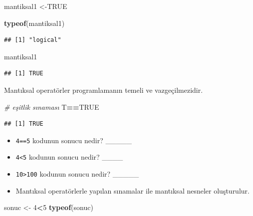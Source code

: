 \documentclass[
  oneside]{book}
\newenvironment{Shaded}{\begin{snugshade}}{\end{snugshade}}
\newcommand{\CommentTok}[1]{\textcolor[rgb]{0.56,0.35,0.01}{\textit{#1}}}
\newcommand{\ConstantTok}[1]{\textcolor[rgb]{0.56,0.35,0.01}{#1}}
\newcommand{\DecValTok}[1]{\textcolor[rgb]{0.00,0.00,0.81}{#1}}
\newcommand{\FunctionTok}[1]{\textcolor[rgb]{0.13,0.29,0.53}{\textbf{#1}}}
\newcommand{\NormalTok}[1]{#1}
\newcommand{\OtherTok}[1]{\textcolor[rgb]{0.56,0.35,0.01}{#1}}
\newcommand{\SpecialCharTok}[1]{\textcolor[rgb]{0.81,0.36,0.00}{\textbf{#1}}}
\begin{document}
\begin{Shaded}
\begin{Highlighting}[]
\NormalTok{mantiksal1 }\OtherTok{\textless{}{-}}\ConstantTok{TRUE}
\end{Highlighting}
\end{Shaded}

\begin{Shaded}
\begin{Highlighting}[]
\FunctionTok{typeof}\NormalTok{(mantiksal1)}
\end{Highlighting}
\end{Shaded}

\begin{verbatim}
## [1] "logical"
\end{verbatim}

\begin{Shaded}
\begin{Highlighting}[]
\NormalTok{mantiksal1}
\end{Highlighting}
\end{Shaded}

\begin{verbatim}
## [1] TRUE
\end{verbatim}

Mantıksal operatörler programlamanın temeli ve vazgeçilmezidir.

\begin{Shaded}
\begin{Highlighting}[]
\CommentTok{\# eşitlik sınaması}
\NormalTok{T}\SpecialCharTok{==}\ConstantTok{TRUE}
\end{Highlighting}
\end{Shaded}

\begin{verbatim}
## [1] TRUE
\end{verbatim}

\begin{itemize}
\item
  \texttt{4==5} kodunun sonucu nedir? \_\_\_\_\_
\item
  \texttt{4\textless{}5} kodunun sonucu nedir? \_\_\_\_
\item
  \texttt{10\textgreater{}100} kodunun sonucu nedir? \_\_\_\_\_
\item
  Mantıksal operatörlerle yapılan sınamalar ile mantıksal nesneler oluşturulur.
\end{itemize}

\begin{Shaded}
\begin{Highlighting}[]
\NormalTok{sonuc }\OtherTok{\textless{}{-}} \DecValTok{4}\SpecialCharTok{\textless{}}\DecValTok{5}
\FunctionTok{typeof}\NormalTok{(sonuc)}
\end{Highlighting}
\end{Shaded}
\end{document}
